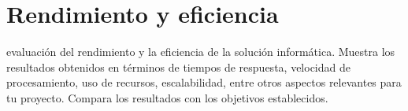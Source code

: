 \section{Rendimiento y eficiencia}

evaluación del rendimiento y la eficiencia de la solución informática.
Muestra los resultados obtenidos en términos de tiempos de respuesta, velocidad de procesamiento, uso de recursos,
escalabilidad, entre otros aspectos relevantes para tu proyecto.
Compara los resultados con los objetivos establecidos.